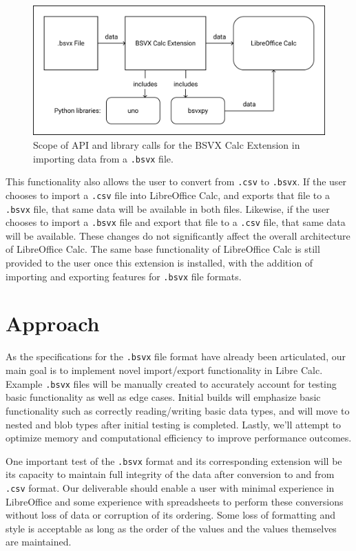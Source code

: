 \documentclass[10pt]{article}
\begin{document}
\begin{figure}[H]
\centering
\includegraphics[width=5in]{figures/bsvxToData.png}
\caption{Scope of API and library calls for the BSVX Calc Extension in importing data from a \texttt{.bsvx} file.}
\label{fig:deliverables_bsvxToData}
\end{figure}

\indent{}
This functionality also allows the user to convert from \texttt{.csv} to \texttt{.bsvx}.
If the user chooses to import a \texttt{.csv} file into LibreOffice Calc, and exports that file to a \texttt{.bsvx} file, that same data will be available in both files.
Likewise, if the user chooses to import a \texttt{.bsvx} file and export that file to a \texttt{.csv} file, that same data will be available.
These changes do not significantly affect the overall architecture of LibreOffice Calc.
The same base functionality of LibreOffice Calc is still provided to the user once this extension is installed, with the addition of importing and exporting features for \texttt{.bsvx} file formats.

\section*{Approach}

As the specifications for the \texttt{.bsvx} file format have already been articulated, our main goal is to implement novel import/export functionality in Libre Calc.
Example \texttt{.bsvx} files will be manually created to accurately account for testing basic functionality as well as edge cases.
Initial builds will emphasize basic functionality such as correctly reading/writing basic data types, and will move to nested and blob types after initial testing is completed.
Lastly, we’ll attempt to optimize memory and computational efficiency to improve performance outcomes.

\indent{}
One important test of the \texttt{.bsvx} format and its corresponding extension will be its capacity to maintain full integrity of the data after conversion to and from \texttt{.csv} format.
Our deliverable should enable a user with minimal experience in LibreOffice and some experience with spreadsheets to perform these conversions without loss of data or corruption of its ordering.
Some loss of formatting and style is acceptable as long as the order of the values and the values themselves are maintained.
\end{document}
